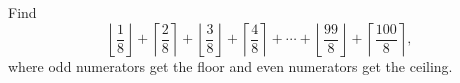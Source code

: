 Find
\[
\left\lfloor\dfrac{1}{8}\right\rfloor+\left\lceil\dfrac{2}{8}\right\rceil+\left\lfloor\dfrac{3}{8}\right\rfloor+\left\lceil\dfrac{4}{8}\right\rceil+\cdots+\left\lfloor\dfrac{99}{8}\right\rfloor+\left\lceil\dfrac{100}{8}\right\rceil,
\]
where odd numerators get the floor and even numerators get the ceiling.

